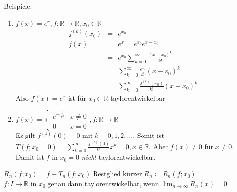 \documentclass[ngerman,titlepage,twoside, parskip=half*]{scrreprt}
\newcommand*{\R}{\mathbb{R}}
\theoremstyle{plain}
\theoremstyle{definition}
\theoremstyle{remark}
\begin{document}
Beispiele:
\begin{enumerate}[(1)]
  \item $f(x)=e^x, f\colon\R\rightarrow\R, x_0\in\R$
    \begin{align*}
      f^{(k)}(x_0)&=& e^{x_0}\\
      f(x)&=& e^x=e^{x_0}e^{x-x_0}\\
      &=& e^{x_0}\sum_{k=0}^\infty \frac{(x-x_0)^k}{k!}\\
      &=& \sum_{k=0}^\infty \frac{e^{x_0}}{k!}(x-x_0)^k\\
      &=& \sum_{k=0}^\infty \frac{f^{(k)}(x_0)}{k!}(x-x_0)^k
    \end{align*}
    Also $f(x)=e^x$ ist für $x_0\in\R$ taylorentwickelbar.
  \item $f(x)=\begin{cases}
      e^{-\frac{1}{x^2}} & x\neq 0\\
      0 & x=0
    \end{cases}, f\colon\R\rightarrow\R$\\
    Es gilt $f^{(k)}(0)=0$ mit $k=0,1,2,\dots$. Somit ist $T(f;x_0=0)=
    \sum_{k=0}^\infty \frac{f^{(k)}(0)}{k!}x^k=0, x\in\R$. Aber $f(x)
    \neq 0$ für $x\neq 0$. Damit ist $f$ in $x_0=0$ \emph{nicht}
    taylorentwickelbar.
\end{enumerate}

$R_n(f;x_0)=f-T_n(f;x_0)$ Restglied kürzer $R_n\coloneqq R_n(f;x_0)$\\
$f\colon I\rightarrow\R$ in $x_0$ genau dann taylorentwickelbar, wenn
$\lim_{n\rightarrow\infty} R_n(x)=0$
\end{document}
